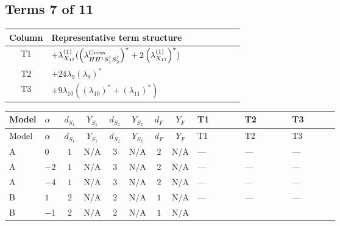 \documentclass[8pt]{article}
\begin{document}
\begin{landscape}
\subsection*{Terms 7 of 11}
\begin{center}
\begin{tabular}{@{}c >{\raggedright\arraybackslash}p{0.82\linewidth}@{}}
\toprule
Column & Representative term structure \\
\midrule
T1 & \(\displaystyle +{\lambda_{X_{17}}^{(1)}} (\left({\lambda_{H H^\dagger S_1^\dagger S_2^\dagger}^{\rm Cross}}\right)^{*}+2 \left({\lambda_{X_{17}}^{(1)}}\right)^{*})\) \\
\midrule
T2 & \(\displaystyle +24 {\lambda_{9}} \left({\lambda_{9}}\right)^{*}\) \\
\midrule
T3 & \(\displaystyle +9 {\lambda_{10}} (\left({\lambda_{10}}\right)^{*}+\left({\lambda_{11}}\right)^{*})\) \\
\midrule
\bottomrule
\end{tabular}
\end{center}
\smallskip
\tiny
\begin{longtable}{@{}llcccccc >{\raggedright\arraybackslash}p{0.21\linewidth} >{\raggedright\arraybackslash}p{0.21\linewidth} >{\raggedright\arraybackslash}p{0.21\linewidth}@{}}
\toprule
Model & $\alpha$ & $d_{S_1}$ & $Y_{S_1}$ & $d_{S_2}$ & $Y_{S_2}$ & $d_F$ & $Y_F$ & T1 & T2 & T3 \\
\midrule
\endfirsthead
\toprule
Model & $\alpha$ & $d_{S_1}$ & $Y_{S_1}$ & $d_{S_2}$ & $Y_{S_2}$ & $d_F$ & $Y_F$ & T1 & T2 & T3 \\
\midrule
\endhead
A & $0$ & $1$ & $\text{N/A}$ & $3$ & $\text{N/A}$ & $2$ & $\text{N/A}$ & --- & --- & --- \\
\midrule
A & $-2$ & $1$ & $\text{N/A}$ & $3$ & $\text{N/A}$ & $2$ & $\text{N/A}$ & --- & --- & --- \\
\midrule
A & $-4$ & $1$ & $\text{N/A}$ & $3$ & $\text{N/A}$ & $2$ & $\text{N/A}$ & --- & --- & --- \\
\midrule
B & $1$ & $2$ & $\text{N/A}$ & $2$ & $\text{N/A}$ & $1$ & $\text{N/A}$ & --- & --- & --- \\
\midrule
B & $-1$ & $2$ & $\text{N/A}$ & $2$ & $\text{N/A}$ & $1$ & $\text{N/A}$ & \scriptsize\adjustbox{max width=\linewidth}{$\begin{gathered} +{\lambda_{X_{17}}^{(1)}} (\left({\lambda_{H H^\dagger S_1^\dagger S_2^\dagger}^{\rm Cross}}\right)^{*}+2 \left({\lambda_{X_{17}}^{(1)}}\right)^{*})\end{gathered}$} & \scriptsize\adjustbox{max width=\linewidth}{$\begin{gathered} +24 {\lambda_{9}} \left({\lambda_{9}}\right)^{*}\end{gathered}$} & \scriptsize\adjustbox{max width=\linewidth}{$\begin{gathered} +9 {\lambda_{10}} (\left({\lambda_{10}}\right)^{*}+\left({\lambda_{11}}\right)^{*}) \\ +9 {\lambda_{11}} (\left({\lambda_{10}}\right)^{*}+\left({\lambda_{11}}\right)^{*})\end{gathered}$} \\

\end{longtable}
\end{landscape}
\end{document}
